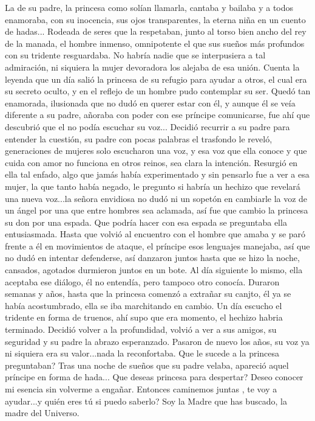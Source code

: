 \documentclass[12pt, a4paper, twoside]{book} %
\begin{document}
La de su padre, la princesa como solían llamarla, cantaba y bailaba y a todos enamoraba, con su inocencia, sus ojos transparentes, la eterna niña en un cuento de hadas...
Rodeada de seres que la respetaban, junto al torso bien ancho del rey de la manada, el hombre inmenso, omnipotente el que sus sueños más profundos con su tridente resguardaba.
No habría nadie que se interpusiera a tal admiración, ni siquiera la mujer devoradora los alejaba de esa unión.
Cuenta la leyenda que un día salió la princesa de su refugio para ayudar a otros, el cual era su secreto oculto, y en el reflejo de un hombre pudo contemplar su ser.
Quedó tan enamorada, ilusionada que no dudó en querer estar con él, y aunque él se veía diferente a su padre, añoraba con poder con ese príncipe comunicarse, fue ahí que descubrió que el no podía escuchar su voz...
Decidió recurrir a su padre para entender la cuestión, su padre con pocas palabras el trasfondo le reveló, generaciones de mujeres solo escucharon una voz, y esa voz que ella conoce y que cuida con amor no funciona en otros reinos, sea clara la intención. Resurgió en ella tal enfado, algo que jamás había experimentado y sin pensarlo fue a ver a esa mujer, la que tanto había negado, le pregunto si habría un hechizo que revelará una nueva voz...la señora envidiosa no dudó ni un sopetón en cambiarle la voz de un ángel por una que entre hombres sea aclamada, así  fue que cambio la princesa su don por una espada.
Que podría hacer con esa espada se preguntaba ella entusiasmada.
Hasta que volvió al encuentro con el hombre que amaba y se paró frente a él en movimientos de ataque, el príncipe esos lenguajes manejaba, así que no dudó en intentar defenderse, así danzaron juntos hasta que se hizo la noche, cansados, agotados durmieron juntos en un bote.
Al día siguiente lo mismo, ella aceptaba ese diálogo, él no entendía, pero tampoco otro conocía.
Duraron semanas y años, hasta que la princesa comenzó a extrañar su canjto, él ya se había acostumbrado, ella se iba marchitando en cambio.
Un día escucho el tridente en forma de truenos, ahí supo que era momento, el hechizo habria terminado.
Decidió volver a la profundidad, volvió a ver a sus amigos, su seguridad y su padre la abrazo esperanzado.
Pasaron de nuevo los años, su voz ya ni siquiera era su valor...nada la reconfortaba.
Que le sucede a la princesa preguntaban?
Tras una noche de sueños que su padre velaba, apareció aquel príncipe en forma de  hada...
Que deseas princesa para despertar? Deseo conocer mi esencia sin volverme a engañar.
Entonces caminemos juntas , te voy a ayudar...y quién eres tú si puedo saberlo?
Soy la Madre que has buscado, la madre del Universo.
\end{document}
